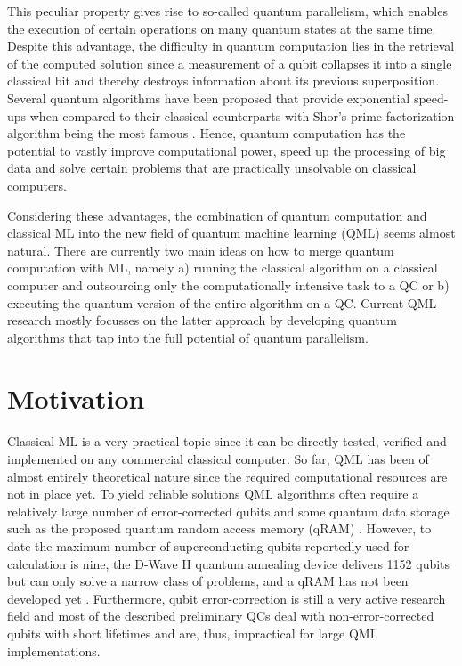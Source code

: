 This peculiar property gives rise to so-called quantum parallelism, which enables the execution of certain operations on many quantum states at the same time. Despite this advantage, the difficulty in quantum computation lies in the retrieval of the computed solution since a measurement of a qubit collapses it into a single classical bit and thereby destroys information about its previous superposition. Several quantum algorithms have been proposed that provide exponential speed-ups when compared to their classical counterparts with Shor's prime factorization algorithm being the most famous \cite{shor1994}.
Hence, quantum computation has the potential to vastly improve computational power, speed up the processing of big data and solve certain problems that are practically unsolvable on classical computers. 


Considering these advantages, the combination of quantum computation and classical ML into the new field of quantum machine learning (QML) seems almost natural. There are currently two main ideas on how to merge quantum computation with ML, namely a) running the classical algorithm on a classical computer and outsourcing only the computationally intensive task to a QC or b) executing the quantum version of the entire algorithm on a QC. Current QML research mostly focusses on the latter approach by developing quantum algorithms that tap into the full potential of quantum parallelism.

\section{Motivation}
\label{sec:motivation}

Classical ML is a very practical topic since it can be directly tested, verified and implemented on any commercial classical computer. So far, QML has been of almost entirely theoretical nature since the required computational resources are not in place yet. To yield reliable solutions QML algorithms often require a relatively large number of error-corrected qubits and some quantum data storage such as the proposed quantum random access memory (qRAM) \cite{qRAM}. However, to date the maximum number of superconducting qubits reportedly used for calculation is nine, the D-Wave II quantum annealing device delivers 1152 qubits but can only solve a narrow class of problems, and a qRAM has not been developed yet \cite{hydrogensimulation, dwave2}. Furthermore, qubit error-correction is still a very active research field and most of the described preliminary QCs deal with non-error-corrected qubits with short lifetimes and are, thus, impractical for large QML implementations.

